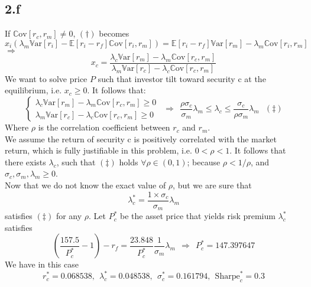 \documentclass[10 pt]{hwtemplate} %
\begin{document}
\subsection*{2.f} If $\mathrm{\mathbb{C}ov}\left[r_c, r_m\right]\ne 0$, $(\dag)$ becomes
\begin{equation}
  x_i(\lambda_m \mathrm{\mathbb{V}ar}\left[r_i\right]-\mathbb{E}\left[r_i - r_f\right] \mathrm{\mathbb{C}ov}\left[r_i, r_m\right])=\mathbb{E}\left[r_i - r_f\right]\mathrm{\mathbb{V}ar}\left[r_m\right] - \lambda_m \mathrm{\mathbb{C}ov}\left[r_i, r_m\right]
\end{equation}
$\Rightarrow$ 
\begin{equation}
  x_c = \frac{\lambda_c\mathrm{\mathbb{V}ar}\left[r_m\right] - \lambda_m \mathrm{\mathbb{C}ov}\left[r_c, r_m\right]}{\lambda_m \mathrm{\mathbb{V}ar}\left[r_c\right]- \lambda_c \mathrm{\mathbb{C}ov}\left[r_c, r_m\right]}
\end{equation}
We want to solve price $P$ such that investor tilt toward security c at the equilibrium, i.e. $x_c\geq 0$. It follows that:
\begin{equation}
  \begin{cases}
    \lambda_c\mathrm{\mathbb{V}ar}\left[r_m\right] - \lambda_m \mathrm{\mathbb{C}ov}\left[r_c, r_m\right] \geq 0\\
    \lambda_m \mathrm{\mathbb{V}ar}\left[r_c\right]- \lambda_c \mathrm{\mathbb{C}ov}\left[r_c, r_m\right] \geq 0
  \end{cases}~~\Rightarrow~~  \frac{\rho \sigma_c}{\sigma_m}\lambda_m \leq \lambda_c \leq \frac{\sigma_c}{\rho \sigma_m}\lambda_m~~~(\ddag)
\end{equation}
Where $\rho$ is the correlation coefficient between $r_c$ and $r_m$. \\
We assume the return of security c is positively correlated with the market return, which is fully justifiable in this problem, i.e. $0 < \rho < 1$. It follows that there exists $\lambda_c$, such that $(\ddag)$ holds $\forall \rho \in (0,1)$; because $\rho<1/\rho$, and $\sigma_c, \sigma_m, \lambda_m \geq 0$.\\
Now that we do not know the exact value of $\rho$, but we are sure that
$$
\lambda_c^* = \frac{1\times\sigma_c}{\sigma_m} \lambda_m
$$
satisfies $(\ddag)$ for any $\rho$. Let $P^*_c$ be the asset price that yields risk premium $\lambda_c^*$ satisfies
$$
\left(\frac{157.5}{P_c^*} - 1\right) -r_f = \frac{23.848}{P^*_c}\frac{1}{\sigma_m} \lambda_m~~\Rightarrow~~P_c^* = 147.397647
$$
We have in this case
$$
r_c^*=0.068538,~~\lambda_c^* = 0.048538,~~\sigma_c^* = 0.161794,~~\text{Sharpe}_c^* = 0.3
$$
\end{document}
